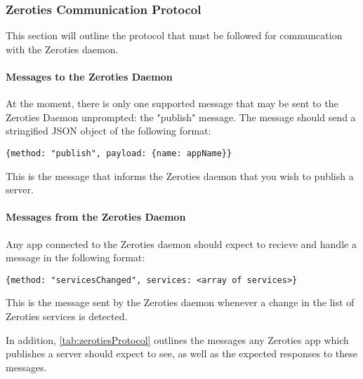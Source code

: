 


\subsubsection{Zeroties Communication Protocol}
This section will outline the protocol that must be followed for communcation with the Zeroties daemon.
\paragraph{Messages to the Zeroties Daemon}
At the moment, there is only one supported message that may be sent to the Zeroties Daemon unprompted: the "publish" message.
The message should send a stringified JSON object of the following format: \begin{verbatim}{method: "publish", payload: {name: appName}}\end{verbatim}
This is the message that informs the Zeroties daemon that you wish to publish a server.

\paragraph{Messages from the Zeroties Daemon}
Any app connected to the Zeroties daemon should expect to recieve and handle a message in the following format:
\begin{verbatim}{method: "servicesChanged", services: <array of services>}\end{verbatim}
This is the message sent by the Zeroties daemon whenever a change in the list of Zeroties services is detected.

In addition, \autoref{tab:zerotiesProtocol} outlines the messages any Zeroties app which publishes a server should expect to see, as well as the expected responses to these messages.


